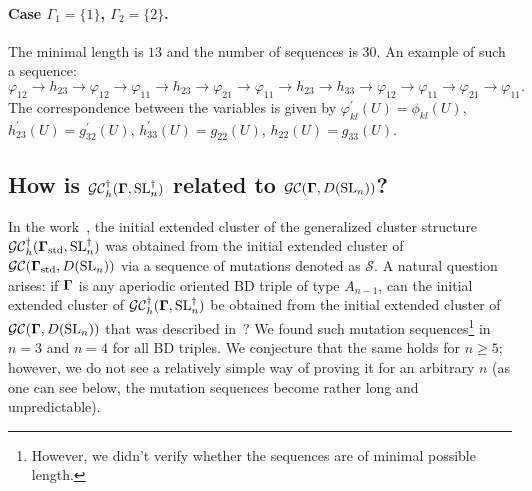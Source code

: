 \paragraph{Case $\Gamma_1 = \{1\}$, $\Gamma_2 = \{2\}$.} The minimal length is $13$ and the number of sequences is $30$. An example of such a sequence:
\begin{equation}
\varphi_{12} \rightarrow h_{23} \rightarrow \varphi_{12} \rightarrow \varphi_{11} \rightarrow h_{23} \rightarrow \varphi_{21} \rightarrow \varphi_{11} \rightarrow h_{23} \rightarrow h_{33} \rightarrow \varphi_{12} \rightarrow \varphi_{11} \rightarrow \varphi_{21} \rightarrow \varphi_{11}.
\end{equation}
The correspondence between the variables is given by $\varphi_{kl}^{\prime}(U) = \phi_{kl}(U)$, $h_{23}^{\prime}(U) = g_{32}^{\prime}(U)$, $h_{33}^{\prime}(U) = g_{22}(U)$, $h_{22}(U) = g_{33}(U)$.

\subsection{How is $\mathcal{GC}_h^\dagger(\mathbf{\Gamma},\operatorname{SL}_n^\dagger)$ related to $\mathcal{GC}(\mathbf{\Gamma},D(\operatorname{SL}_n))$?}
In the work~\cite{double}, the initial extended cluster of the generalized cluster structure $\mathcal{GC}_h^{\dagger}(\mathbf{\Gamma}_{\text{std}},\operatorname{SL}_n^{\dagger})$ was obtained from the initial extended cluster of $\mathcal{GC}(\mathbf{\Gamma}_{\text{std}},D(\operatorname{SL}_n))$ via a sequence of mutations denoted as $\mathcal{S}$. A natural question arises: if $\mathbf{\Gamma}$ is any aperiodic oriented BD triple of type $A_{n-1}$, can the initial extended cluster of $\mathcal{GC}_h^{\dagger}(\mathbf{\Gamma},\operatorname{SL}_n^{\dagger})$ be obtained from the initial extended cluster of $\mathcal{GC}(\mathbf{\Gamma},D(\operatorname{SL}_n))$ that was described in~\cite{multdouble}? We found such mutation sequences\footnote{However, we didn't verify whether the sequences are of minimal possible length.} in $n=3$ and $n=4$ for all BD triples. We conjecture that the same holds for $n \geq 5$; however, we do not see a relatively simple way of proving it for an arbitrary $n$ (as one can see below, the mutation sequences become rather long and unpredictable).

